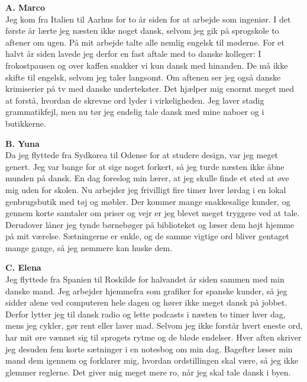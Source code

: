 \textbf{\color{NCDNavy}A. Marco}\\
Jeg kom fra Italien til Aarhus for to år siden for at arbejde som ingeniør. I det første år lærte jeg næsten ikke noget dansk, selvom jeg gik på sprogskole to aftener om ugen. På mit arbejde talte alle nemlig engelsk til møderne. For et halvt år siden lavede jeg derfor en fast aftale med to danske kolleger: I frokostpausen og over kaffen snakker vi kun dansk med hinanden. De må ikke skifte til engelsk, selvom jeg taler langsomt. Om aftenen ser jeg også danske krimiserier på tv med danske undertekster. Det hjælper mig enormt meget med at forstå, hvordan de skrevne ord lyder i virkeligheden. Jeg laver stadig grammatikfejl, men nu tør jeg endelig tale dansk med mine naboer og i butikkerne.

\vspace{0.3em}
\textbf{\color{NCDNavy}B. Yuna}\\
Da jeg flyttede fra Sydkorea til Odense for at studere design, var jeg meget genert. Jeg var bange for at sige noget forkert, så jeg turde næsten ikke åbne munden på dansk. En dag foreslog min lærer, at jeg skulle finde et sted at øve mig uden for skolen. Nu arbejder jeg frivilligt fire timer hver lørdag i en lokal genbrugsbutik med tøj og møbler. Der kommer mange snakkesalige kunder, og gennem korte samtaler om priser og vejr er jeg blevet meget tryggere ved at tale. Derudover låner jeg tynde børnebøger på biblioteket og læser dem højt hjemme på mit værelse. Sætningerne er enkle, og de samme vigtige ord bliver gentaget mange gange, så jeg nemmere kan huske dem.

\vspace{0.3em}
\textbf{\color{NCDNavy}C. Elena}\\
Jeg flyttede fra Spanien til Roskilde for halvandet år siden sammen med min danske mand. Jeg arbejder hjemmefra som grafiker for spanske kunder, så jeg sidder alene ved computeren hele dagen og hører ikke meget dansk på jobbet. Derfor lytter jeg til dansk radio og lette podcasts i næsten to timer hver dag, mens jeg cykler, gør rent eller laver mad. Selvom jeg ikke forstår hvert eneste ord, har mit øre vænnet sig til sprogets rytme og de bløde endelser. Hver aften skriver jeg desuden fem korte sætninger i en notesbog om min dag. Bagefter læser min mand dem igennem og forklarer mig, hvordan ordstillingen skal være, så jeg ikke glemmer reglerne. Det giver mig meget mere ro, når jeg skal tale dansk i byen.


